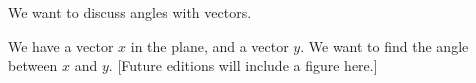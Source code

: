 
We want to discuss angles with vectors.

We have a vector $x$ in the plane, and a vector $y$.
We want to find the angle between $x$ and $y$.
[Future editions will include a figure here.]

\blankpage
